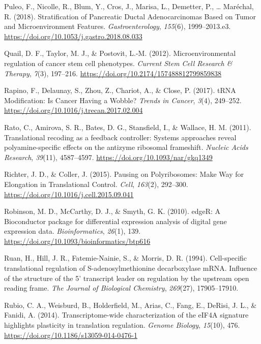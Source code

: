 \documentclass[12pt,openany]{book}
\begin{document}
\hypertarget{ref-Puleo2018}{}
Puleo, F., Nicolle, R., Blum, Y., Cros, J., Marisa, L., Demetter, P.,
\ldots{} Maréchal, R. (2018). Stratification of Pancreatic Ductal
Adenocarcinomas Based on Tumor and Microenvironment Features.
\emph{Gastroenterology}, \emph{155}(6), 1999--2013.e3.
\url{https://doi.org/10.1053/j.gastro.2018.08.033}

\hypertarget{ref-Quail2012}{}
Quail, D. F., Taylor, M. J., \& Postovit, L.-M. (2012).
Microenvironmental regulation of cancer stem cell phenotypes.
\emph{Current Stem Cell Research \& Therapy}, \emph{7}(3), 197--216.
\url{https://doi.org/10.2174/157488812799859838}

\hypertarget{ref-Rapino2017}{}
Rapino, F., Delaunay, S., Zhou, Z., Chariot, A., \& Close, P. (2017).
tRNA Modification: Is Cancer Having a Wobble? \emph{Trends in Cancer},
\emph{3}(4), 249--252.
\url{https://doi.org/10.1016/j.trecan.2017.02.004}

\hypertarget{ref-Rato2011}{}
Rato, C., Amirova, S. R., Bates, D. G., Stansfield, I., \& Wallace, H.
M. (2011). Translational recoding as a feedback controller: Systems
approaches reveal polyamine-specific effects on the antizyme ribosomal
frameshift. \emph{Nucleic Acids Research}, \emph{39}(11), 4587--4597.
\url{https://doi.org/10.1093/nar/gkq1349}

\hypertarget{ref-Richter2015}{}
Richter, J. D., \& Coller, J. (2015). Pausing on Polyribosomes: Make Way
for Elongation in Translational Control. \emph{Cell}, \emph{163}(2),
292--300. \url{https://doi.org/10.1016/j.cell.2015.09.041}

\hypertarget{ref-Robinson2010}{}
Robinson, M. D., McCarthy, D. J., \& Smyth, G. K. (2010). edgeR: A
Bioconductor package for differential expression analysis of digital
gene expression data. \emph{Bioinformatics}, \emph{26}(1), 139.
\url{https://doi.org/10.1093/bioinformatics/btp616}

\hypertarget{ref-Ruan1994}{}
Ruan, H., Hill, J. R., Fatemie-Nainie, S., \& Morris, D. R. (1994).
Cell-specific translational regulation of S-adenosylmethionine
decarboxylase mRNA. Influence of the structure of the 5' transcript
leader on regulation by the upstream open reading frame. \emph{The
Journal of Biological Chemistry}, \emph{269}(27), 17905--17910.

\hypertarget{ref-Rubio2014}{}
Rubio, C. A., Weisburd, B., Holderfield, M., Arias, C., Fang, E.,
DeRisi, J. L., \& Fanidi, A. (2014). Transcriptome-wide characterization
of the eIF4A signature highlights plasticity in translation regulation.
\emph{Genome Biology}, \emph{15}(10), 476.
\url{https://doi.org/10.1186/s13059-014-0476-1}
\end{document}

